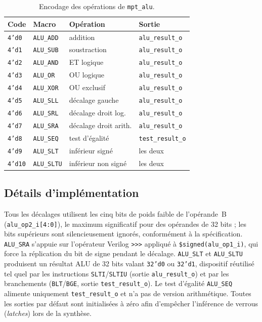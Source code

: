\documentclass[11pt,a4paper,oneside]{report}
\begin{document}
\begin{table}[h]
\caption{Encodage des opérations de \texttt{mpt\_alu}.}
\label{tab:alu-ops}
\centering
\begin{tabular}{@{}llll@{}}
\toprule
Code & Macro & Opération & Sortie \\
\midrule
\texttt{4'd0}  & \texttt{ALU\_ADD}  & addition           & \texttt{alu\_result\_o} \\
\texttt{4'd1}  & \texttt{ALU\_SUB}  & soustraction       & \texttt{alu\_result\_o} \\
\texttt{4'd2}  & \texttt{ALU\_AND}  & ET logique         & \texttt{alu\_result\_o} \\
\texttt{4'd3}  & \texttt{ALU\_OR}   & OU logique         & \texttt{alu\_result\_o} \\
\texttt{4'd4}  & \texttt{ALU\_XOR}  & OU exclusif        & \texttt{alu\_result\_o} \\
\texttt{4'd5}  & \texttt{ALU\_SLL}  & décalage gauche    & \texttt{alu\_result\_o} \\
\texttt{4'd6}  & \texttt{ALU\_SRL}  & décalage droit log.& \texttt{alu\_result\_o} \\
\texttt{4'd7}  & \texttt{ALU\_SRA}  & décalage droit arith.& \texttt{alu\_result\_o} \\
\texttt{4'd8}  & \texttt{ALU\_SEQ}  & test d'égalité     & \texttt{test\_result\_o} \\
\texttt{4'd9}  & \texttt{ALU\_SLT}  & inférieur signé    & les deux \\
\texttt{4'd10} & \texttt{ALU\_SLTU} & inférieur non signé& les deux \\
\bottomrule
\end{tabular}
\end{table}

\subsection{Détails d'implémentation}
Tous les décalages utilisent les cinq bits de poids faible de
l'opérande~B (\texttt{alu\_op2\_i[4:0]}), le maximum significatif
pour des opérandes de 32 bits ; les bits supérieurs sont
silencieusement ignorés, conformément à la spécification.
\texttt{ALU\_SRA} s'appuie sur l'opérateur Verilog \texttt{>>>}
appliqué à \texttt{\$signed(alu\_op1\_i)}, qui force la
réplication du bit de signe pendant le décalage. \texttt{ALU\_SLT}
et \texttt{ALU\_SLTU} produisent un résultat ALU de 32 bits valant
\texttt{32'd0} ou \texttt{32'd1}, dispositif réutilisé tel quel
par les instructions \texttt{SLTI}/\texttt{SLTIU} (sortie
\texttt{alu\_result\_o}) et par les branchements
(\texttt{BLT}/\texttt{BGE}, sortie \texttt{test\_result\_o}). Le
test d'égalité \texttt{ALU\_SEQ} alimente uniquement
\texttt{test\_result\_o} et n'a pas de version arithmétique.
Toutes les sorties par défaut sont initialisées à zéro afin
d'empêcher l'inférence de verrous (\textit{latches}) lors de la
synthèse.
\end{document}
